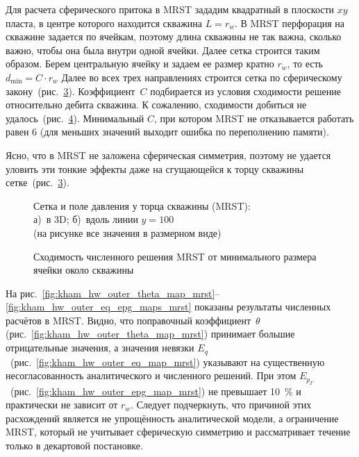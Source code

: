 \documentclass{article}
\begin{document}
Для расчета сферического притока в MRST зададим квадратный в плоскости $xy$ пласта,
в центре которого находится скважина $L=r_w$. В MRST перфорация на скважине задается
по ячейкам, поэтому длина скважины не так важна, сколько важно, чтобы она была внутри
одной ячейки. Далее сетка строится таким образом. Берем центральную ячейку и задаем ее
размер кратно $r_w$, то есть $d_{\text{min}} = C \cdot r_w$ Далее во всех трех направлениях
строится сетка по сферическому закону~(рис.~\ref{fig:kham_hw_outer_grid_mrst}). Коэффициент~$C$
подбирается из условия сходимости решение относительно дебита скважина. К сожалению,
сходимости добиться не удалось~(рис.~\ref{fig:kham_hw_outer_q_C_conv_MRST}).
Минимальный $C$, при котором MRST не отказывается работать равен 6 (для меньших значений выходит ошибка по переполнению памяти).

Ясно, что в MRST не заложена сферическая симметрия, поэтому не удается уловить эти тонкие эффекты даже на сгущающейся к торцу скважины сетке~(рис.~\ref{fig:kham_hw_outer_grid_mrst}).
\begin{figure}[H]
	\centering
	\begin{subfigure}{0.48\textwidth}
		\centering
		
		\caption{}
		\label{fig:kham_hw_outer_grid_mrst_3D}
	\end{subfigure}
	\hfill
	\begin{subfigure}{0.48\textwidth}
		\centering
		
		\caption{}
		\label{fig:kham_hw_outer_grid_mrst_xz}
	\end{subfigure}
	\caption{
		Сетка и поле давления у торца скважины (MRST): \\
		а)~в 3D; %
		б)~вдоль линии $y=100$ \\
		(на рисунке все значения в размерном виде)
	}
	\label{fig:kham_hw_outer_grid_mrst}
\end{figure}

\begin{figure}[H]
	\centering
	
	\caption{Сходимость численного решения MRST от минимального размера ячейки около скважины}
	\label{fig:kham_hw_outer_q_C_conv_MRST}
\end{figure}

На рис.~\ref{fig:kham_hw_outer_theta_map_mrst}--\ref{fig:kham_hw_outer_eq_epg_maps_mrst}
показаны результаты численных расчётов в MRST. Видно, что поправочный коэффициент~$\theta$
(рис.~\ref{fig:kham_hw_outer_theta_map_mrst}) принимает большие отрицательные значения,
а значения невязки $E_q$~(рис.~\ref{fig:kham_hw_outer_eq_map_mrst}) указывают на существенную
несогласованность аналитического и численного решений. При этом $E_{p_\Gamma}$~(рис.~\ref{fig:kham_hw_outer_epg_map_mrst})
не превышает 10~\% и практически не зависит от $r_w$. Следует подчеркнуть, что причиной этих
расхождений является не упрощённость аналитической модели, а ограничение MRST, который не учитывает
сферическую симметрию и рассматривает течение только в декартовой постановке.
\end{document}
